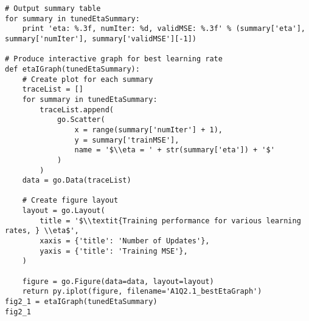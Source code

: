 \documentclass[a4paper,12pt]{article}
\begin{document}
\begin{verbatim}
# Output summary table
for summary in tunedEtaSummary:
    print 'eta: %.3f, numIter: %d, validMSE: %.3f' % (summary['eta'], summary['numIter'], summary['validMSE'][-1])
    
# Produce interactive graph for best learning rate
def etaIGraph(tunedEtaSummary):
    # Create plot for each summary
    traceList = []
    for summary in tunedEtaSummary:
        traceList.append(
            go.Scatter(
                x = range(summary['numIter'] + 1),
                y = summary['trainMSE'],
                name = '$\\eta = ' + str(summary['eta']) + '$'
            )
        )
    data = go.Data(traceList)
    
    # Create figure layout
    layout = go.Layout(
        title = '$\\textit{Training performance for various learning rates, } \\eta$',
        xaxis = {'title': 'Number of Updates'},
        yaxis = {'title': 'Training MSE'},
    )

    figure = go.Figure(data=data, layout=layout)
    return py.iplot(figure, filename='A1Q2.1_bestEtaGraph')
fig2_1 = etaIGraph(tunedEtaSummary)
fig2_1
\end{verbatim}
\end{document}
